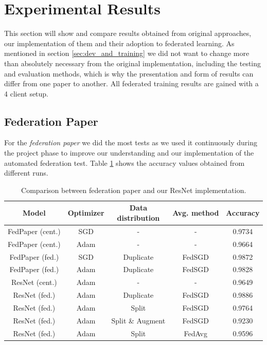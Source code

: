 \section{Experimental Results}
This section will show and compare results obtained from original approaches, our implementation of them and their adoption to federated learning. As mentioned in section \ref{sec:dev_and_training} we did not want to change more than absolutely necessary from the original implementation, including the testing and evaluation methods, which is why the presentation and form of results can differ from one paper to another. All federated training results are gained with a 4 client setup.


\subsection{Federation Paper}\label{subsec:results_federation_paper}
For the \textit{federation paper} we did the most tests as we used it continuously during the project phase to improve our understanding and our implementation of the automated federation test. Table \ref{tab:results_federation_paper} shows the accuracy values obtained from different runs.

\begin{table}[htbp]
    \small
    \centering
    \caption{Comparison between federation paper\cite{federated_machine_learning} and our ResNet implementation.}
    \begin{tabular}{c|c|c|c|c}
        Model & Optimizer & \shortstack[c]{Data\\distribution} & Avg. method & Accuracy\\
        \hline
        FedPaper (cent.) & SGD & - & - & 0.9734 \\
        FedPaper (cent.) & Adam & - & - & 0.9664 \\
        FedPaper (fed.) & SGD & Duplicate & FedSGD & 0.9872\\
        FedPaper (fed.) & Adam & Duplicate & FedSGD & 0.9828\\
        ResNet (cent.) & Adam & - & - & 0.9649 \\
        ResNet (fed.) & Adam & Duplicate & FedSGD & 0.9886 \\
        ResNet (fed.) & Adam & Split & FedSGD & 0.9764 \\
        ResNet (fed.) & Adam & Split \& Augment & FedSGD & 0.9230 \\
        ResNet (fed.) & Adam & Split & FedAvg & 0.9596 \\
    \end{tabular}
    \label{tab:results_federation_paper}
\end{table}

